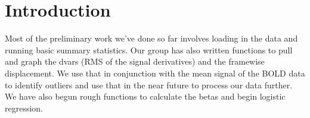 \section{Introduction}
Most of the preliminary work we've done so far involves loading in the data 
and running basic summary statistics. Our group has also written functions to 
pull and graph the dvars (RMS of the signal derivatives) and the framewise 
displacement. We use that in conjunction with the mean signal of the BOLD data 
to identify outliers and use that in the near future to process our data 
further. We have also begun rough functions to calculate the betas and begin 
logistic regression. 
